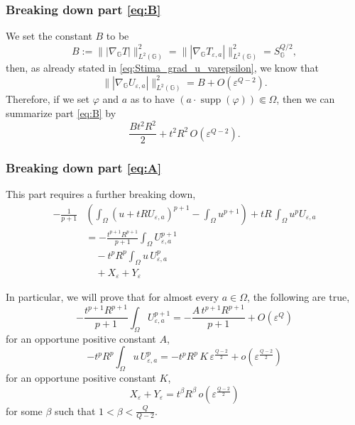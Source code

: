\documentclass[11pt]{amsart}
\numberwithin{equation}{section} %
\theoremstyle{definition}
\newcommand{\be}{\beta}
\def\G{\mathbb{G}}
\DeclareMathOperator{\supp}{supp}
\begin{document}
\subsubsection*{Breaking down part \eqref{eq:B}}

We set the constant $B$ to be
\[
B:=\||\nabla_{\G}T|\|_{L^2(\G)}^2=\||\nabla_{\G}T_{\varepsilon,a}|\|_{L^2(\G)}^2=S_\G^{Q\slash 2},
\]
then, as already stated in \eqref{eq:Stima_grad_u_varepsilon},
we know that
\[
\||\nabla_\G U_{\varepsilon,a}|\|_{L^2(\G)}^2=B+O(\varepsilon^{Q-2}).
\]
Therefore, if we set $\varphi$ and $a$ as to have $\left(a\cdot \supp( \varphi)\right)\Subset \Omega$,
then we can
 summarize part \eqref{eq:B} by 
\begin{equation}\label{partB}
    \frac{Bt^2R^2}{2}+t^2R^2\, O(\varepsilon^{Q-2}).
\end{equation}

\subsubsection*{Breaking down part \eqref{eq:A}}

This part requires a further breaking down,
\begin{align*}
    -\frac{1}{p+1}&\left(\int_\Omega (u+tRU_{\varepsilon,a})^{p+1}-\int_\Omega u ^{p+1}\right)+tR\, \int_\Omega u^pU_{\varepsilon,a} \\
&= -\frac{t^{p+1}R^{p+1}}{p+1}\int_\Omega U_{\varepsilon,a}^{p+1}\tag{A1}\\
& \quad-t^pR^p\int_\Omega u\, U_{\varepsilon,a}^p\tag{A2}\\
& \quad +X_\varepsilon + Y_\varepsilon\tag{A3}
\end{align*}

In particular, we will prove that for almost every $a\in \Omega$, the following
are true,
\begin{equation}\label{a1}\tag{A1}
    -\frac{t^{p+1}R^{p+1}}{p+1}\int_\Omega U_{\varepsilon,a}^{p+1}=-\frac{A\, t^{p+1}R^{p+1}}{p+1}+O(\varepsilon^Q)
\end{equation}
for an opportune positive constant $A$,
\begin{equation}\label{a2}\tag{A2}
-t^pR^p\int_\Omega u \, U_{\varepsilon,a}^p=-t^pR^p\, K\, \varepsilon^{\frac{Q-2}{2}}+o(\varepsilon^{\frac{Q-2}{2}})
\end{equation}
 for an opportune positive constant $K$,
\begin{equation}\label{a3}\tag{A3}
    X_\varepsilon + Y_\varepsilon=t^\be R^\be\, o(\varepsilon^{\frac{Q-2}{2}})
\end{equation}
for some $\beta$ such that $1< \beta< \frac{Q}{Q-2}$.\newline
\end{document}

